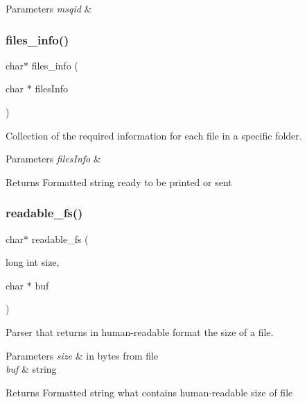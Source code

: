 \begin{DoxyParams}{Parameters}
{\em msqid} & \\
\hline
\end{DoxyParams}
\mbox{\label{fileserv_8h_a49cfaf7b6d546c559fb0901bd5ba3e65}} 
\subsubsection{files\+\_\+info()}
{\footnotesize\ttfamily char$\ast$ files\+\_\+info (\begin{DoxyParamCaption}\item[{char $\ast$}]{files\+Info }\end{DoxyParamCaption})}



Collection of the required information for each file in a specific folder. 


\begin{DoxyParams}{Parameters}
{\em files\+Info} & \\
\hline
\end{DoxyParams}
\begin{DoxyReturn}{Returns}
Formatted string ready to be printed or sent 
\end{DoxyReturn}
\mbox{\label{fileserv_8h_aaa60420f4ed2522f7e58eedb72afea48}} 
\subsubsection{readable\+\_\+fs()}
{\footnotesize\ttfamily char$\ast$ readable\+\_\+fs (\begin{DoxyParamCaption}\item[{long int}]{size,  }\item[{char $\ast$}]{buf }\end{DoxyParamCaption})}



Parser that returns in human-\/readable format the size of a file. 


\begin{DoxyParams}{Parameters}
{\em size} & in bytes from file \\
\hline
{\em buf} & string \\
\hline
\end{DoxyParams}
\begin{DoxyReturn}{Returns}
Formatted string what contains human-\/readable size of file 
\end{DoxyReturn}

